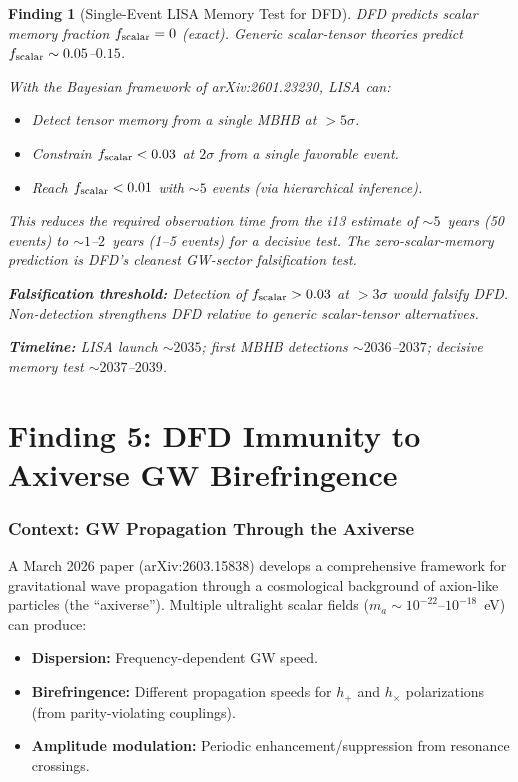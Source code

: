 \documentclass[11pt]{article}
\newtheorem{finding}{Finding}
\begin{document}
\begin{finding}[Single-Event LISA Memory Test for DFD]
\label{find:memory-bayes}
DFD predicts scalar memory fraction $f_{\rm scalar} = 0$ (exact).
Generic scalar-tensor theories predict $f_{\rm scalar} \sim 0.05$--$0.15$.

With the Bayesian framework of arXiv:2601.23230, LISA can:
\begin{itemize}[nosep]
\item Detect tensor memory from a single MBHB at $> 5\sigma$.
\item Constrain $f_{\rm scalar} < 0.03$ at $2\sigma$ from a single
  favorable event.
\item Reach $f_{\rm scalar} < 0.01$ with $\sim 5$ events (via
  hierarchical inference).
\end{itemize}

This reduces the required observation time from the i13 estimate
of $\sim 5$~years (50 events) to $\sim 1$--$2$~years (1--5 events)
for a decisive test. The zero-scalar-memory prediction is DFD's
cleanest GW-sector falsification test.

\textbf{Falsification threshold:} Detection of $f_{\rm scalar} > 0.03$
at $> 3\sigma$ would falsify DFD. Non-detection strengthens DFD
relative to generic scalar-tensor alternatives.

\textbf{Timeline:} LISA launch $\sim 2035$; first MBHB detections
$\sim 2036$--$2037$; decisive memory test $\sim 2037$--$2039$.
\end{finding}


\part{Finding 5: DFD Immunity to Axiverse GW Birefringence}
\label{part:axiverse}

\section{Context: GW Propagation Through the Axiverse}

A March 2026 paper (arXiv:2603.15838) develops a comprehensive
framework for gravitational wave propagation through a cosmological
background of axion-like particles (the ``axiverse''). Multiple
ultralight scalar fields ($m_a \sim 10^{-22}$--$10^{-18}$~eV) can
produce:
\begin{itemize}[nosep]
\item \textbf{Dispersion:} Frequency-dependent GW speed.
\item \textbf{Birefringence:} Different propagation speeds for $h_+$
  and $h_\times$ polarizations (from parity-violating couplings).
\item \textbf{Amplitude modulation:} Periodic enhancement/suppression
  from resonance crossings.
\end{itemize}
\end{document}
